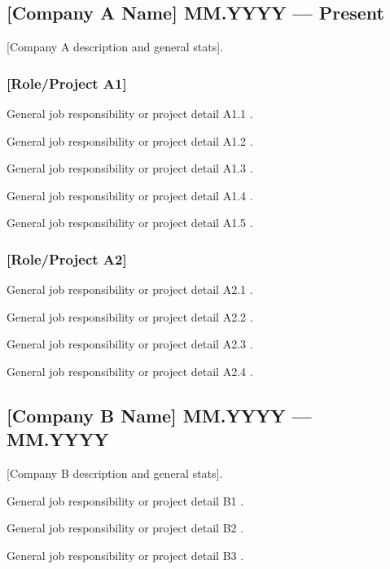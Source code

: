 \subsection{{[Company A Name] \hfill MM.YYYY --- Present}}

[Company A description and general stats].

\subsubsection{[Role/Project A1]}
\begin{zitemize}
  \item [General job responsibility or project detail A1.1].
  \item [General job responsibility or project detail A1.2].
  \item [General job responsibility or project detail A1.3].
  \item [General job responsibility or project detail A1.4].
  \item [General job responsibility or project detail A1.5].
\end{zitemize}

\subsubsection{[Role/Project A2]}
\begin{zitemize}
  \item [General job responsibility or project detail A2.1].
  \item [General job responsibility or project detail A2.2].
  \item [General job responsibility or project detail A2.3].
  \item [General job responsibility or project detail A2.4].
\end{zitemize}

\subsection{{[Company B Name] \hfill MM.YYYY --- MM.YYYY}}

[Company B description and general stats].

\begin{zitemize}
  \item [General job responsibility or project detail B1].
  \item [General job responsibility or project detail B2].
  \item [General job responsibility or project detail B3].
\end{zitemize}


